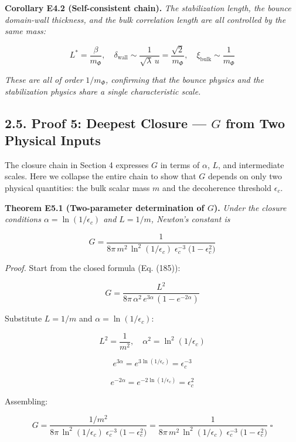 \documentclass[
  11pt,
]{article}
\begin{document}
\textbf{Corollary E4.2 (Self-consistent chain).} \emph{The stabilization
length, the bounce domain-wall thickness, and the bulk correlation
length are all controlled by the same mass:}

\[L^* = \frac{\beta}{m_\Phi}, \quad \delta_{\text{wall}} \sim \frac{1}{\sqrt{\lambda}\,u} = \frac{\sqrt{2}}{m_\Phi}, \quad \xi_{\text{bulk}} \sim \frac{1}{m_\Phi} \tag{75}\]

\emph{These are all of order \(1/m_\Phi\), confirming that the bounce
physics and the stabilization physics share a single characteristic
scale.}

\bigskip

\hypertarget{proof-5-deepest-closure-g-from-two-physical-inputs}{%
\subsection{\texorpdfstring{2.5. Proof 5: Deepest Closure --- \(G\) from
Two Physical
Inputs}{2.5. Proof 5: Deepest Closure --- G from Two Physical Inputs}}\label{proof-5-deepest-closure-g-from-two-physical-inputs}}

The closure chain in Section 4 expresses \(G\) in terms of \(\alpha\),
\(L\), and intermediate scales. Here we collapse the entire chain to
show that \(G\) depends on only two physical quantities: the bulk scalar
mass \(m\) and the decoherence threshold \(\epsilon_c\).

\textbf{Theorem E5.1 (Two-parameter determination of \(G\)).}
\emph{Under the closure conditions \(\alpha = \ln(1/\epsilon_c)\) and
\(L = 1/m\), Newton's constant is}

\[G = \frac{1}{8\pi\,m^2\,\ln^2(1/\epsilon_c)\;\epsilon_c^{-3}\;\bigl(1 - \epsilon_c^2\bigr)} \tag{76}\]

\emph{Proof.} Start from the closed formula (Eq. (185)):

\[G = \frac{L^2}{8\pi\,\alpha^2\,e^{3\alpha}\,(1 - e^{-2\alpha})} \tag{77}\]

Substitute \(L = 1/m\) and \(\alpha = \ln(1/\epsilon_c)\):

\[L^2 = \frac{1}{m^2}, \quad \alpha^2 = \ln^2(1/\epsilon_c) \tag{78}\]

\[e^{3\alpha} = e^{3\ln(1/\epsilon_c)} = \epsilon_c^{-3} \tag{79}\]

\[e^{-2\alpha} = e^{-2\ln(1/\epsilon_c)} = \epsilon_c^{2} \tag{80}\]

Assembling:

\[G = \frac{1/m^2}{8\pi\,\ln^2(1/\epsilon_c)\;\epsilon_c^{-3}\;\bigl(1 - \epsilon_c^{2}\bigr)} = \frac{1}{8\pi\,m^2\,\ln^2(1/\epsilon_c)\;\epsilon_c^{-3}\;\bigl(1 - \epsilon_c^{2}\bigr)} \;\square \tag{81}\]
\end{document}
